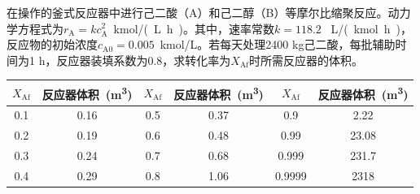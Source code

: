 \documentclass[dvipsnames, svgnames, x11names]{beamer}
\begin{document}
\begin{frame}[t]
    \frametitle{}
    \begin{question}
        在操作的釜式反应器中进行己二酸（A）和己二醇（B）等摩尔比缩聚反应。动力学方程式为$r_\mathrm{A} = kc_\mathrm{A}^2$\ \si{kmol/(L.h)}。其中，速率常数$k = 118.2$ \ \si{L/(kmol.h)}，反应物的初始浓度$c_\mathrm{A0} = 0.005$\ \si{kmol/L}。若每天处理2400 kg己二酸，每批辅助时间为1 h，反应器装填系数为0.8，求转化率为$X_\mathrm{Af}$时所需反应器的体积。
        \begin{table}
            \centering
            \begin{tabular}{cc||cc||cc}
                \bottomrule
                $X_\mathrm{Af}$ & 反应器体积\ (\si{m^3}) & $X_\mathrm{Af}$ & 反应器体积\ (\si{m^3}) & $X_\mathrm{Af}$ & 反应器体积\ (\si{m^3}) \\ \hline
                0.1 & 0.16 & 0.5 & 0.37 & 0.9 & 2.22 \\ 
                0.2 & 0.19 & 0.6 & 0.48 & 0.99 & 23.08 \\ 
                0.3 & 0.24 & 0.7 & 0.68 & 0.999 & 231.7 \\ 
                0.4 & 0.29 & 0.8 & 1.06 & 0.9999 & 2318 \\ \toprule
            \end{tabular}
        \end{table}
    \end{question}
\end{frame}
\end{document}
